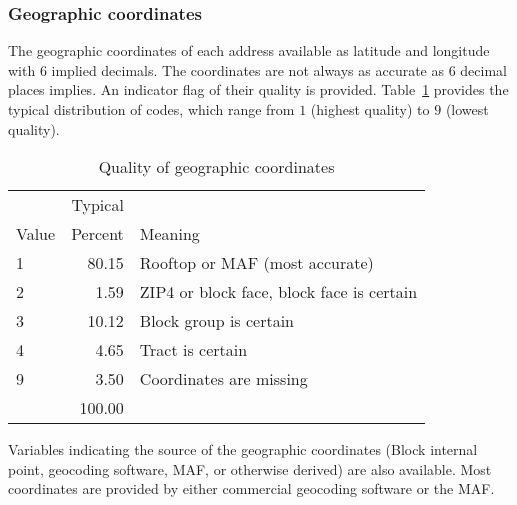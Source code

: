 \subsubsection{Geographic coordinates}

The geographic coordinates of each address available as latitude and
longitude
with 6 implied decimals.
The coordinates are not always as accurate as 6 decimal places implies. An
indicator flag of their quality is provided. Table~\ref{tab:gal:geoqual}
provides the typical distribution of codes, which range from $1$ (highest
quality) to $9$ (lowest quality).

\begin{table}[htbp]
  \centering
  \caption{Quality of geographic coordinates}
  \label{tab:gal:geoqual}
  \begin{tabular}{lrl}
      &Typical\\
Value &  Percent&   Meaning\\
\hline
\hline
1     &         80.15  &        Rooftop or MAF (most accurate)\\
2     &          1.59  &        ZIP4 or block face, block face is certain\\
3     &         10.12  &        Block group is certain\\
4     &          4.65  &        Tract is certain\\
9     &          3.50  &        Coordinates are missing\\
\hline
      &        100.00  &\\
  \end{tabular}
\end{table}

%

Variables indicating the source of the geographic coordinates (Block
internal point, geocoding software, MAF, or otherwise derived) are also
available. Most coordinates are provided by either commercial geocoding
software or the MAF.


